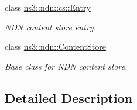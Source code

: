 \begin{DoxyCompactItemize}
class \hyperlink{classns3_1_1ndn_1_1cs_1_1Entry}{ns3\+::ndn\+::cs\+::\+Entry}
\begin{DoxyCompactList}\small\item\em N\+DN content store entry. \end{DoxyCompactList}\item 
class \hyperlink{classns3_1_1ndn_1_1ContentStore}{ns3\+::ndn\+::\+Content\+Store}
\begin{DoxyCompactList}\small\item\em Base class for N\+DN content store. \end{DoxyCompactList}\end{DoxyCompactItemize}


\subsection{Detailed Description}
